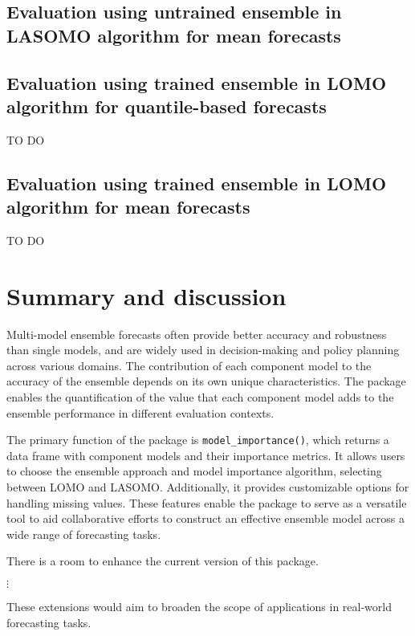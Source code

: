 \documentclass[
  article,
  shortnames,
  notitle]{jss}
\begin{document}
\subsection{Evaluation using untrained ensemble in LASOMO algorithm for
mean forecasts}\label{sec:untrained-lasomo-mean}

\subsection{Evaluation using trained ensemble in LOMO algorithm for
quantile-based forecasts}\label{sec:trained-lomo-qntl}

TO DO

\subsection{Evaluation using trained ensemble in LOMO algorithm for mean
forecasts}\label{sec:trained-lasomo-mean}

TO DO

\section{Summary and discussion}\label{sec:discussion}

Multi-model ensemble forecasts often provide better accuracy and
robustness than single models, and are widely used in decision-making
and policy planning across various domains. The contribution of each
component model to the accuracy of the ensemble depends on its own
unique characteristics. The  package enables the
quantification of the value that each component model adds to the
ensemble performance in different evaluation contexts.

The primary function of the package is \texttt{model\_importance()},
which returns a data frame with component models and their importance
metrics. It allows users to choose the ensemble approach and model
importance algorithm, selecting between LOMO and LASOMO. Additionally,
it provides customizable options for handling missing values. These
features enable the package to serve as a versatile tool to aid
collaborative efforts to construct an effective ensemble model across a
wide range of forecasting tasks.

There is a room to enhance the current version of this package.

\(\vdots\)

These extensions would aim to broaden the scope of applications in
real-world forecasting tasks.


  
\end{document}

